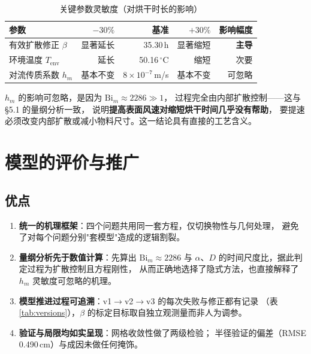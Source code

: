 \documentclass[withoutpreface,bwprint]{cumcmthesis}
\begin{document}
\begin{table}[htbp]
  \centering
  \caption{关键参数灵敏度（对烘干时长的影响）}
  \label{tab:sens}
  \small
  \begin{tabular}{@{}lrrrr@{}}
    \toprule
    参数 & $-30\%$ & 基准 & $+30\%$ & 影响幅度 \\
    \midrule
    有效扩散修正 $\beta$ & 显著延长 & 35.30\,h & 显著缩短 & \textbf{主导} \\
    环境温度 $T_{\text{env}}$ & 延长 & 50.16\,$^\circ$C & 缩短 & 次要 \\
    对流传质系数 $h_m$ & 基本不变 & $8\times10^{-7}$\,m/s & 基本不变 & 可忽略 \\
    \bottomrule
  \end{tabular}
\end{table}

$h_m$ 的影响可忽略，是因为 $\mathrm{Bi}_m\approx2286\gg1$，
过程完全由内部扩散控制——这与 \S5.1 的量纲分析一致，
说明\textbf{提高表面风速对缩短烘干时间几乎没有帮助}，
要提速必须改变内部扩散或减小物料尺寸。这一结论具有直接的工艺含义。

\section{模型的评价与推广}

\subsection{优点}
\begin{enumerate}
  \item \textbf{统一的机理框架}：四个问题共用同一套方程，仅切换物性与几何处理，
        避免了对每个问题分别"套模型"造成的逻辑割裂。
  \item \textbf{量纲分析先于数值计算}：先算出 $\mathrm{Bi}_m\approx2286$ 与
        $\alpha$、$D$ 的时间尺度比，据此判定过程为扩散控制且方程刚性，
        从而正确地选择了隐式方法，也直接解释了 $h_m$ 灵敏度可忽略的机理。
  \item \textbf{模型推进过程可追溯}：v1$\to$v2$\to$v3 的每次失败与修正都有记录
        （表 \ref{tab:versions}），$\beta$ 的标定目标取自独立观测量而非人为调参。
  \item \textbf{验证与局限均如实呈现}：网格收敛性做了两级检验；
        半径验证的偏差（RMSE 0.490\,cm）与成因未做任何掩饰。
\end{enumerate}
\end{document}
